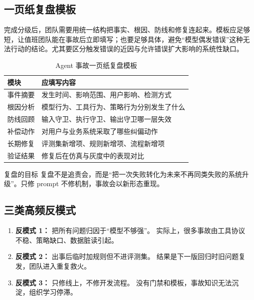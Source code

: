 \documentclass[a4paper]{article}
\begin{document}
\subsection{一页纸复盘模板}

完成分级后，团队需要用统一结构把事实、根因、防线和修复连起来。模板应足够短，让值班团队能在事故后立即填写；也要足够具体，避免“模型偶发错误”这种无法行动的结论。尤其要区分触发错误的近因与允许错误扩大影响的系统性缺口。

\begin{table}[H]
\centering
\caption{Agent 事故一页纸复盘模板}
\begin{tabularx}{\textwidth}{>{\raggedright\arraybackslash}p{3cm} >{\raggedright\arraybackslash}X}
\toprule
模块 & 应填写内容 \\
\midrule
事件摘要 & 发生时间、影响范围、用户影响、检测方式 \\
根因分析 & 模型行为、工具行为、策略行为分别发生了什么 \\
防线回顾 & 输入守卫、执行守卫、输出守卫哪一层失效 \\
补偿动作 & 对用户与业务系统采取了哪些纠偏动作 \\
长期修复 & 评测集新增项、规则新增项、流程新增项 \\
验证结果 & 修复后在仿真与灰度中的表现对比 \\
\bottomrule
\end{tabularx}
\end{table}

\begin{importantbox}{复盘的目标}
复盘不是追责会，而是“把一次失败转化为未来不再同类失败的系统升级”。只修 prompt 不修机制，事故会以新形态重现。
\end{importantbox}

\subsection{三类高频反模式}

\begin{enumerate}[leftmargin=1.8em]
    \item \textbf{反模式 1：} 把所有问题归因于“模型不够强”。
    实际上，很多事故由工具协议不稳、策略缺口、数据脏读引起。
    \item \textbf{反模式 2：} 出事后临时加规则但不进评测集。
    结果是下一版回归时旧问题复发，团队进入重复救火。
    \item \textbf{反模式 3：} 只修线上，不修开发流程。
    没有门禁和模板，事故知识无法沉淀，组织学习停滞。
\end{enumerate}
\end{document}
